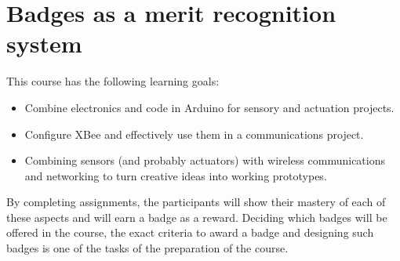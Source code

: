 \documentclass{tufte-book} %
\begin{document}
\section{Badges as a merit recognition system}

This course has the following learning goals:
\begin{itemize}
\item Combine electronics and code in Arduino for sensory and actuation projects.
\item Configure XBee and effectively use them in a communications project.
\item Combining sensors (and probably actuators) with wireless communications and networking to turn creative ideas into working prototypes.
\end{itemize}

By completing assignments, the participants will show their mastery of each of these aspects and will earn a badge as a reward.
Deciding which badges will be offered in the course, the exact criteria to award a badge and designing such badges is one of the tasks of the preparation of the course.
\end{document}
